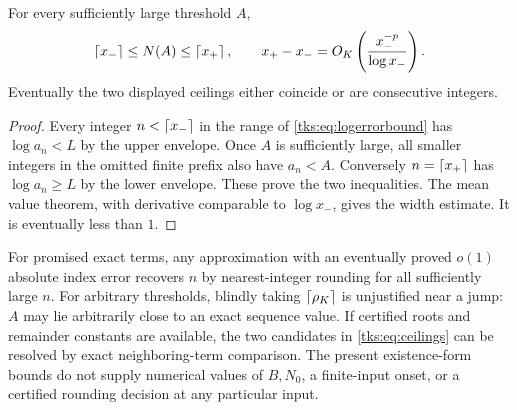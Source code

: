 \begin{theorem}\label{tks:thm:ceilings}
For every sufficiently large threshold $A$,
\begin{equation}\label{tks:eq:ceilings}
\left\lceil x_-\right\rceil\leq N(A)\leq\left\lceil x_+\right\rceil,\qquad
x_+-x_-=O_K\left(\frac{x_-^{-p}}{\log x_-}\right).
\end{equation}
Eventually the two displayed ceilings either coincide or are consecutive integers.
\end{theorem}
\begin{proof}
Every integer $n<\left\lceil x_-\right\rceil$ in the range of \eqref{tks:eq:logerrorbound} has $\log a_n<L$ by the upper envelope. Once $A$ is sufficiently large, all smaller integers in the omitted finite prefix also have $a_n<A$. Conversely $n=\left\lceil x_+\right\rceil$ has $\log a_n\geq L$ by the lower envelope. These prove the two inequalities. The mean value theorem, with derivative comparable to $\log x_-$, gives the width estimate. It is eventually less than $1$.
\end{proof}

For promised exact terms, any approximation with an eventually proved $o(1)$ absolute index error recovers $n$ by nearest-integer rounding for all sufficiently large $n$. For arbitrary thresholds, blindly taking $\left\lceil \rho_K\right\rceil$ is unjustified near a jump: $A$ may lie arbitrarily close to an exact sequence value. If certified roots and remainder constants are available, the two candidates in \eqref{tks:eq:ceilings} can be resolved by exact neighboring-term comparison. The present existence-form bounds do not supply numerical values of $B,N_0$, a finite-input onset, or a certified rounding decision at any particular input.


